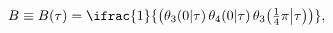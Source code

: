 \[B\equiv B(\tau)=\ifrac{1}{\left(\mathop{\theta_{3}\/}\nolimits\!\left(0\middle%
|\tau\right)\mathop{\theta_{4}\/}\nolimits\!\left(0\middle|\tau\right)\mathop{%
\theta_{3}\/}\nolimits\!\left(\tfrac{1}{4}\pi\middle|\tau\right)\right)},\]